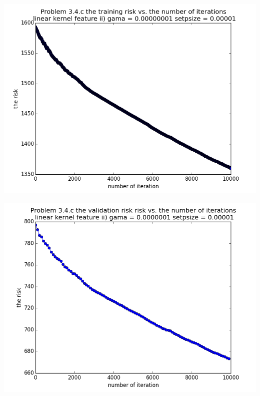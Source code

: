 \documentclass[11pt]{article}
\begin{document}
\begin{itemize}
\begin{itemize}
\includegraphics[scale=0.6]{16}

\includegraphics[scale=0.6]{17}

\end{itemize}
\end{itemize}
\end{document}
